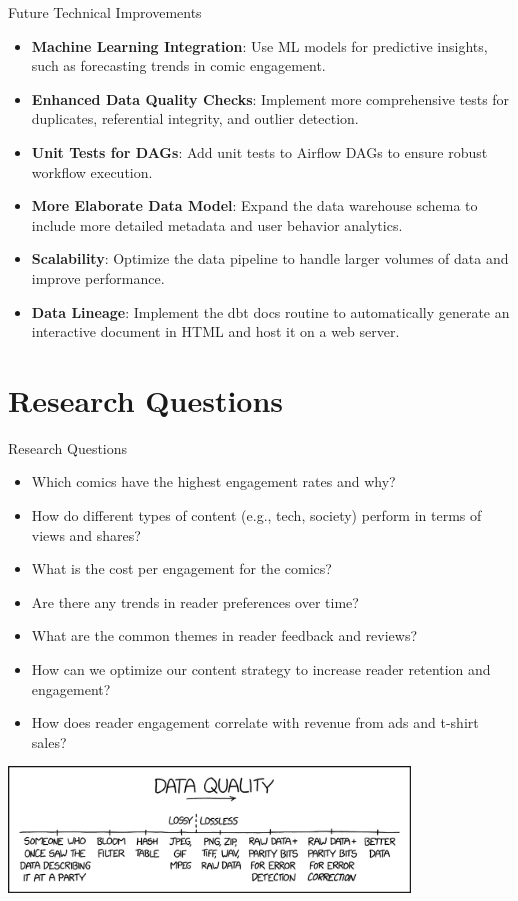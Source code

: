 \documentclass{beamer}
\begin{document}
\begin{frame}{Future Technical Improvements}
    \begin{itemize}
        \item \textbf{Machine Learning Integration}: Use ML models for predictive insights, such as forecasting trends in comic engagement.
        \item \textbf{Enhanced Data Quality Checks}: Implement more comprehensive tests for duplicates, referential integrity, and outlier detection.
        \item \textbf{Unit Tests for DAGs}: Add unit tests to Airflow DAGs to ensure robust workflow execution.
        \item \textbf{More Elaborate Data Model}: Expand the data warehouse schema to include more detailed metadata and user behavior analytics.
        \item \textbf{Scalability}: Optimize the data pipeline to handle larger volumes of data and improve performance.
        \item \textbf{Data Lineage}: Implement the dbt docs routine to automatically generate an interactive document in HTML and host it on a web server.
    \end{itemize}
\end{frame}

\section{Research Questions}
\begin{frame}{Research Questions}
    \small
    \begin{itemize}
        \item Which comics have the highest engagement rates and why?
        \item How do different types of content (e.g., tech, society) perform in terms of views and shares?
        \item What is the cost per engagement for the comics?
        \item Are there any trends in reader preferences over time?
        \item What are the common themes in reader feedback and reviews?
        \item How can we optimize our content strategy to increase reader retention and engagement?
        \item How does reader engagement correlate with revenue from ads and t-shirt sales?
    \end{itemize}
    \centering
    \includegraphics[width=0.8\textwidth]{../screenshots/data_quality_2x.png}
\end{frame}
\end{document}
